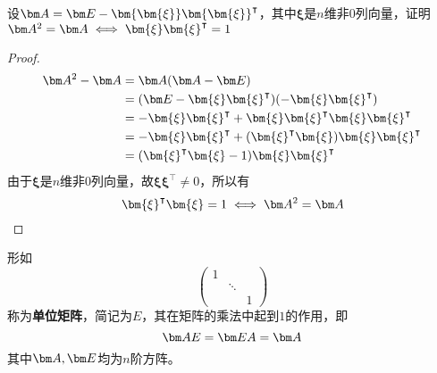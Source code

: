 \begin{example}
    设$\mat{A}=\mat{E}-\bm{\bm{\xi}}\bm{\bm{\xi}}^\intercal$，其中$\bm{\xi}$是$n$维非$0$列向量，证明
    $\mat{A}^2=\mat{A}\iff \bm{\xi}\bm{\xi}^\intercal = 1$
\end{example}
\begin{proof}
    \begin{align*}
        \mat{A}^2-\mat{A} & = \mat{A}(\mat{A}-\mat{E})                                                             \\
                          & = (\mat{E}-\bm{\xi}\bm{\xi}^\intercal)(-\bm{\xi}\bm{\xi}^\intercal)                    \\
                          & = -\bm{\xi}\bm{\xi}^\intercal + \bm{\xi}\bm{\xi}^\intercal\bm{\xi}\bm{\xi}^\intercal   \\
                          & = -\bm{\xi}\bm{\xi}^\intercal + (\bm{\xi}^\intercal\bm{\xi})\bm{\xi}\bm{\xi}^\intercal \\
                          & = (\bm{\xi}^\intercal\bm{\xi}-1)\bm{\xi}\bm{\xi}^\intercal                             \\
    \end{align*}
    由于$\bm{\xi}$是$n$维非$0$列向量，故$\bm{\xi}\bm{\xi}^\intercal\neq 0$，所以有
    \[\bm{\xi}^\intercal\bm{\xi} = 1 \iff \mat{A}^2 = \mat{A} \]
\end{proof}

形如
\[
    \begin{pmatrix}
        1 &        &   \\
          & \ddots &   \\
          &        & 1
    \end{pmatrix}
\]
称为\textbf{\textsf{单位矩阵}}，简记为$E$，其在矩阵的乘法中起到$1$的作用，即
\[ \mat{AE} = \mat{EA} = \mat{A} \]
其中$\mat{A},\mat{E}$均为$n$阶方阵。

